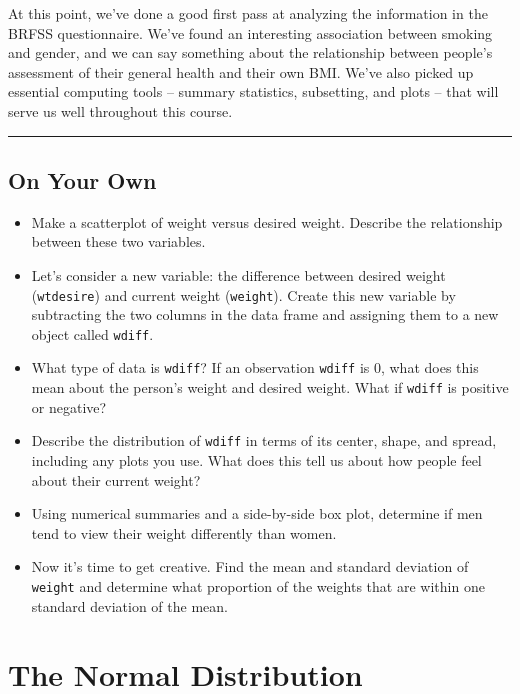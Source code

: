 \documentclass[]{book}
\theoremstyle{definition}
\theoremstyle{definition}
\theoremstyle{definition}
\theoremstyle{remark}
\begin{document}
At this point, we've done a good first pass at analyzing the information
in the BRFSS questionnaire. We've found an interesting association
between smoking and gender, and we can say something about the
relationship between people's assessment of their general health and
their own BMI. We've also picked up essential computing tools -- summary
statistics, subsetting, and plots -- that will serve us well throughout
this course.

\begin{center}\rule{0.5\linewidth}{\linethickness}\end{center}

\section{On Your Own}\label{on-your-own-1}

\begin{itemize}
\item
  Make a scatterplot of weight versus desired weight. Describe the
  relationship between these two variables.
\item
  Let's consider a new variable: the difference between desired weight
  (\texttt{wtdesire}) and current weight (\texttt{weight}). Create this
  new variable by subtracting the two columns in the data frame and
  assigning them to a new object called \texttt{wdiff}.
\item
  What type of data is \texttt{wdiff}? If an observation \texttt{wdiff}
  is 0, what does this mean about the person's weight and desired
  weight. What if \texttt{wdiff} is positive or negative?
\item
  Describe the distribution of \texttt{wdiff} in terms of its center,
  shape, and spread, including any plots you use. What does this tell us
  about how people feel about their current weight?
\item
  Using numerical summaries and a side-by-side box plot, determine if
  men tend to view their weight differently than women.
\item
  Now it's time to get creative. Find the mean and standard deviation of
  \texttt{weight} and determine what proportion of the weights that are
  within one standard deviation of the mean.
\end{itemize}

\chapter{The Normal Distribution}\label{the-normal-distribution}
\end{document}

